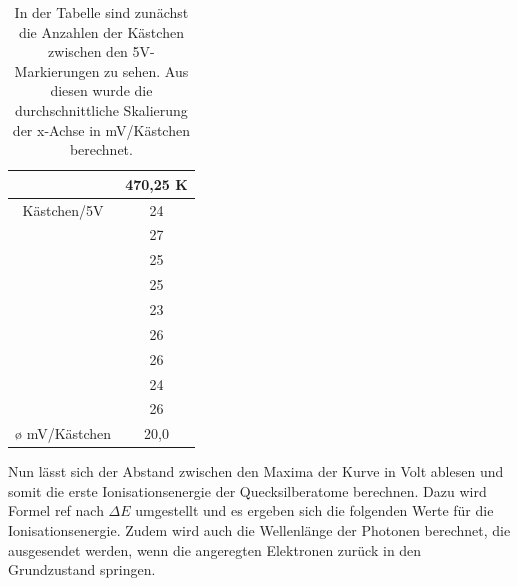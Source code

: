 \documentclass[titlepage = firstcover]{scrartcl}
\begin{document}
            \begin{table}[h]
                \centering
                \caption{In der Tabelle sind zunächst die Anzahlen der Kästchen zwischen den 5V-Markierungen zu sehen. Aus diesen wurde die durchschnittliche Skalierung der x-Achse in mV/Kästchen berechnet.}
                \label{tab:Tabelle1}

                \begin{tabular}{c c}
                    \toprule
                    {} & {470,25 K}  \\
                    \midrule
                    Kästchen/5V   & 24  \\
                                  & 27  \\
                                  & 25  \\
                                  & 25  \\
                                  & 23  \\
                                  & 26  \\
                                  & 26  \\
                                  & 24  \\
                                  & 26  \\
                    \o \; mV/Kästchen & 20,0  \\
                    \bottomrule
                \end{tabular}

            \end{table}

            \FloatBarrier
            \noindent
            Nun lässt sich der Abstand zwischen den Maxima der Kurve in Volt ablesen und somit die erste Ionisationsenergie der Quecksilberatome berechnen. Dazu wird Formel ref nach $\Delta E$ 
            umgestellt und es ergeben sich die folgenden Werte für die Ionisationsenergie. Zudem wird auch die Wellenlänge der Photonen berechnet, die ausgesendet werden, wenn die angeregten 
            Elektronen zurück in den Grundzustand springen.
\end{document}

